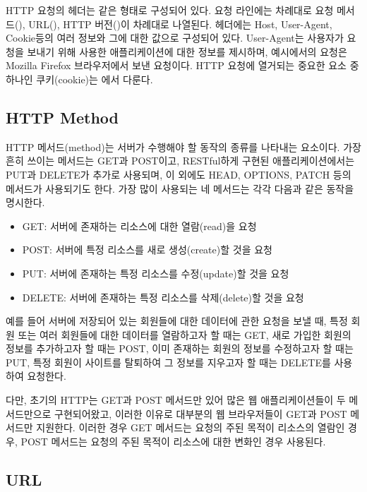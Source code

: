 HTTP 요청의 헤더는 \과 같은 형태로 구성되어 있다. 요청 라인에는 차례대로 요청 메서드(), URL(), HTTP 버전()이 차례대로 나열된다. 헤더에는 Host, User-Agent, Cookie등의 여러 정보와 그에 대한 값으로 구성되어 있다. User-Agent는 사용자가 요청을 보내기 위해 사용한 애플리케이션에 대한 정보를 제시하며, 예시에서의 요청은 Mozilla Firefox 브라우저에서 보낸 요청이다. HTTP 요청에 열거되는 중요한 요소 중 하나인 쿠키(cookie)는 에서 다룬다.

\subsection*{HTTP Method}

HTTP 메서드(method)는 서버가 수행해야 할 동작의 종류를 나타내는 요소이다. 가장 흔히 쓰이는 메서드는 GET과 POST이고, RESTful하게 구현된 애플리케이션에서는 PUT과 DELETE가 추가로 사용되며, 이 외에도 HEAD, OPTIONS, PATCH 등의 메서드가 사용되기도 한다. 가장 많이 사용되는 네 메서드는 각각 다음과 같은 동작을 명시한다.

\begin{itemize}
    \item GET: 서버에 존재하는 리소스에 대한 열람(read)을 요청
    \item POST: 서버에 특정 리소스를 새로 생성(create)할 것을 요청
    \item PUT: 서버에 존재하는 특정 리소스를 수정(update)할 것을 요청
    \item DELETE: 서버에 존재하는 특정 리소스를 삭제(delete)할 것을 요청
\end{itemize}

예를 들어 서버에 저장되어 있는 회원들에 대한 데이터에 관한 요청을 보낼 때, 특정 회원 또는 여러 회원들에 대한 데이터를 열람하고자 할 때는 GET, 새로 가입한 회원의 정보를 추가하고자 할 때는 POST, 이미 존재하는 회원의 정보를 수정하고자 할 때는 PUT, 특정 회원이 사이트를 탈퇴하여 그 정보를 지우고자 할 때는 DELETE를 사용하여 요청한다.

다만, 초기의 HTTP는 GET과 POST 메서드만 있어 많은 웹 애플리케이션들이 두 메서드만으로 구현되어왔고, 이러한 이유로 대부분의 웹 브라우저들이 GET과 POST 메서드만 지원한다. 이러한 경우 GET 메서드는 요청의 주된 목적이 리소스의 열람인 경우, POST 메서드는 요청의 주된 목적이 리소스에 대한 변화인 경우 사용된다.

\subsection*{URL}


